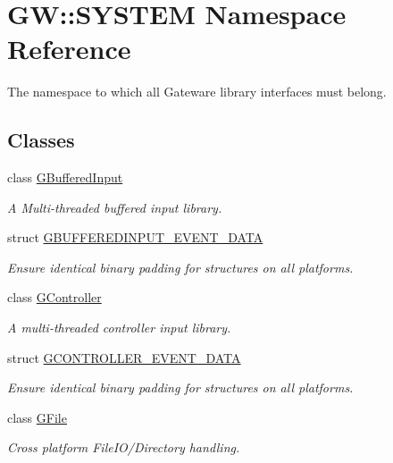 \hypertarget{namespace_g_w_1_1_s_y_s_t_e_m}{}\section{GW\+:\+:S\+Y\+S\+T\+EM Namespace Reference}
\label{namespace_g_w_1_1_s_y_s_t_e_m}


The namespace to which all Gateware library interfaces must belong.  


\subsection*{Classes}
\begin{DoxyCompactItemize}
\item 
class \mbox{\hyperlink{class_g_w_1_1_s_y_s_t_e_m_1_1_g_buffered_input}{G\+Buffered\+Input}}
\begin{DoxyCompactList}\small\item\em A Multi-\/threaded buffered input library. \end{DoxyCompactList}\item 
struct \mbox{\hyperlink{struct_g_w_1_1_s_y_s_t_e_m_1_1_g_b_u_f_f_e_r_e_d_i_n_p_u_t___e_v_e_n_t___d_a_t_a}{G\+B\+U\+F\+F\+E\+R\+E\+D\+I\+N\+P\+U\+T\+\_\+\+E\+V\+E\+N\+T\+\_\+\+D\+A\+TA}}
\begin{DoxyCompactList}\small\item\em Ensure identical binary padding for structures on all platforms. \end{DoxyCompactList}\item 
class \mbox{\hyperlink{class_g_w_1_1_s_y_s_t_e_m_1_1_g_controller}{G\+Controller}}
\begin{DoxyCompactList}\small\item\em A multi-\/threaded controller input library. \end{DoxyCompactList}\item 
struct \mbox{\hyperlink{struct_g_w_1_1_s_y_s_t_e_m_1_1_g_c_o_n_t_r_o_l_l_e_r___e_v_e_n_t___d_a_t_a}{G\+C\+O\+N\+T\+R\+O\+L\+L\+E\+R\+\_\+\+E\+V\+E\+N\+T\+\_\+\+D\+A\+TA}}
\begin{DoxyCompactList}\small\item\em Ensure identical binary padding for structures on all platforms. \end{DoxyCompactList}\item 
class \mbox{\hyperlink{class_g_w_1_1_s_y_s_t_e_m_1_1_g_file}{G\+File}}
\begin{DoxyCompactList}\small\item\em Cross platform File\+I\+O/\+Directory handling. \end{DoxyCompactList}\item 

\end{DoxyCompactItemize}
